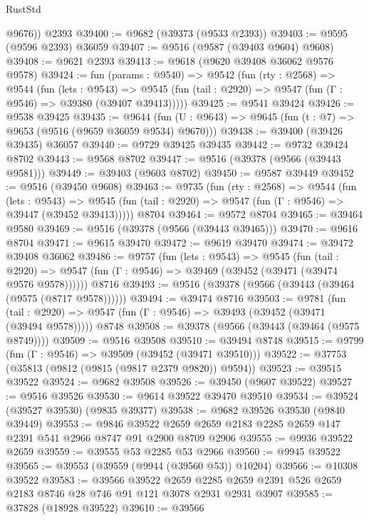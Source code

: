 \begin{lexlean}{RustStd}
\begin{coremodule}
        @9676))
    @2393
@39400 := @9682 (@39373 (@9533 @2393))
@39403 := @9595 (@9596 @2393) @36059
@39407 := @9516 (@9587 (@39403 @9604) @9608)
@39408 := @9621 @2393
@39413 := @9618 (@9620 @39408 @36062 @9576 @9578)
@39424 := fun (params : @9540) =>
  @9542
    (fun (rty : @2568) =>
    @9544
      (fun (lets : @9543) =>
      @9545 (fun (tail : @2920) => @9547 (fun (Γ : @9546) => @39380 (@39407 @39413)))))
@39425 := @9541 @39424
@39426 := @9538 @39425
@39435 := @9644
    (fun (U : @9643) => @9645 (fun (t : @7) => @9653 (@9516 (@9659 @36059 @9534) @9670)))
@39438 := @39400 (@39426 @39435) @36057
@39440 := @9729 @39425 @39435
@39442 := @9732 @39424 @8702
@39443 := @9568 @8702
@39447 := @9516 (@39378 (@9566 (@39443 @9581)))
@39449 := @39403 (@9603 @8702)
@39450 := @9587 @39449
@39452 := @9516 (@39450 @9608)
@39463 := @9735
    (fun (rty : @2568) =>
    @9544
      (fun (lets : @9543) =>
      @9545 (fun (tail : @2920) => @9547 (fun (Γ : @9546) => @39447 (@39452 @39413)))))
    @8704
@39464 := @9572 @8704
@39465 := @39464 @9580
@39469 := @9516 (@39378 (@9566 (@39443 @39465)))
@39470 := @9616 @8704
@39471 := @9615 @39470
@39472 := @9619 @39470
@39474 := @39472 @39408 @36062
@39486 := @9757
    (fun (lets : @9543) =>
    @9545
      (fun (tail : @2920) =>
      @9547 (fun (Γ : @9546) => @39469 (@39452 (@39471 (@39474 @9576 @9578))))))
    @8716
@39493 := @9516 (@39378 (@9566 (@39443 (@39464 (@9575 (@8717 @9578))))))
@39494 := @39474 @8716
@39503 := @9781
    (fun (tail : @2920) => @9547 (fun (Γ : @9546) => @39493 (@39452 (@39471 (@39494 @9578)))))
    @8748
@39508 := @39378 (@9566 (@39443 (@39464 (@9575 @8749))))
@39509 := @9516 @39508
@39510 := @39494 @8748
@39515 := @9799 (fun (Γ : @9546) => @39509 (@39452 (@39471 @39510)))
@39522 := @37753 (@35813 (@9812 (@9815 (@9817 @2379 @9820)) @9594))
@39523 := @39515 @39522
@39524 := @9682 @39508
@39526 := @39450 (@9607 @39522)
@39527 := @9516 @39526
@39530 := @9614 @39522 @39470 @39510
@39534 := @39524 (@39527 @39530) (@9835 @39377)
@39538 := @9682 @39526 @39530 (@9840 @39449)
@39553 := @9846
    @39522
    @2659
    @2659
    @2183
    @2285
    @2659
    @147
    @2391
    @541
    @2966
    @8747
    @91
    @2900
    @8709
    @2906
@39555 := @9936 @39522 @2659
@39559 := @39555 @53 @2285 @53 @2966
@39560 := @9945 @39522
@39565 := @39553 (@39559 (@9944 (@39560 @53)) @10204)
@39566 := @10308 @39522
@39583 := @39566
    @39522
    @2659
    @2285
    @2659
    @2391
    @526
    @2659
    @2183
    @8746
    @28
    @746
    @91
    @121
    @3078
    @2931
    @2931
    @3907
@39585 := @37828 (@18928 @39522)
@39610 := @39566

\end{coremodule}
\end{lexlean}
